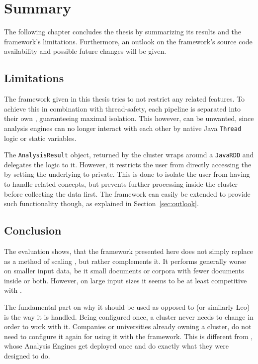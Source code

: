 \chapter{Summary}\label{ch:summary}
The following chapter concludes the thesis by summarizing its results and the framework's limitations. Furthermore, an outlook on the framework's source code availability and possible future changes will be given.

\section{Limitations}
The framework given in this thesis tries to not restrict any \uima{} related features. To achieve this in combination with thread-safety, each pipeline is separated into their own \jvm{}, guaranteeing maximal isolation. This however, can be unwanted, since analysis engines can no longer interact with each other by native Java \lstinline|Thread| logic or static variables. 

The \lstinline|AnalysisResult| object, returned by the \spark{} cluster wraps around a \lstinline|JavaRDD| and delegates the logic to it. However, it restricts the user from directly accessing the \spark{} \api{} by setting the underlying \rdd{} to private. This is done to isolate the user from having to handle \spark{} related concepts, but prevents further processing inside the cluster before collecting the data first. The framework can easily be extended to provide such functionality though, as explained in Section~\ref{sec:outlook}. 

\section{Conclusion}
The evaluation shows, that the framework presented here does not simply replace \uimaas{} as a method of scaling \uima{}, but rather complements it. It performs generally worse on smaller input data, be it small documents or corpora with fewer documents inside or both. However, on large input sizes it seems to be at least competitive with \uimaas{}. 

The fundamental part on why it should be used as opposed to \uimaas{} (or similarly Leo) is the way it is handled. Being configured once, a \spark{} cluster never needs to change in order to work with it. Companies or universities already owning a \spark{} cluster, do not need to configure it again for using it with the framework. This is different from \uimaas{}, whose Analysis Engines get deployed once and do exactly what they were designed to do. 


